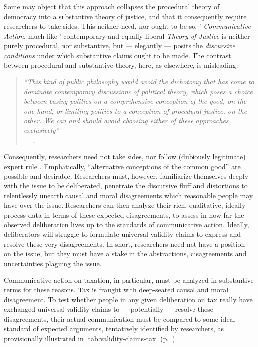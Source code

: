 Some may object that this approach collapses the procedural theory of democracy into a substantive theory of justice, and that it consequently require researchers to take sides.
This neither need, nor ought to be so.
\citeauthor{Habermas-1984-aa}' \emph{Communicative Action}, much like \citeauthor{Rawls-1971-aa}' contemporary and equally liberal \emph{Theory of Justice} is neither purely procedural, nor substantive, but --- elegantly --- posits the \emph{discursive conditions} under which substantive claims ought to be made.
The contrast between procedural and substantive theory, here, as elsewhere, is misleading: 
\begin{quote}
	\emph{``This kind of public philosophy would avoid the dichotomy that has come to dominate contemporary discussions of political theory, which poses a choice between basing politics on a comprehensive conception of the good, on the one hand, or limiting politics to a conception of procedural justice, on the other.
	We can and should avoid choosing either of these approaches exclusively''}\\
	--- \citep[90]{GutmannThompson-2004-aa}.
\end{quote}
Consequently, researchers need not take sides, nor follow (dubiously legitimate) expert rule \citep{Blok2007,Haas1992}.
Emphatically, ``alternative conceptions of the common good'' \citep[23]{Cohen-1989-aa} are possible and desirable.
Researchers must, however, familiarize themselves deeply with the issue to be deliberated, penetrate the discursive fluff and distortions to relentlessly unearth causal and moral disagreements which reasonable people may have over the issue.
Researchers can then analyze their rich, qualitative, ideally process data in terms of these expected disagreements, to assess in how far the observed deliberation lives up to the standards of communicative action.
Ideally, deliberators will struggle to formulate universal validity claims to express and resolve these very disagreements. 
In short, researchers need not have a position on the issue, but they must have a stake in the abstractions, disagreements and uncertainties plaguing the issue.

Communicative action on taxation, in particular, must be analyzed in substantive terms for these reasons.
Tax is fraught with deep-seated causal and moral disagreement.
To test whether people in any given deliberation on tax really have exchanged universal validity claims to --- potentially --- resolve these disagreements, their actual communication must be compared to some ideal standard of expected arguments, tentatively identified by researchers, as provisionally illustrated in \autoref{tab:validity-claims-tax} (p.~\pageref{tab:validity-claims-tax}).

